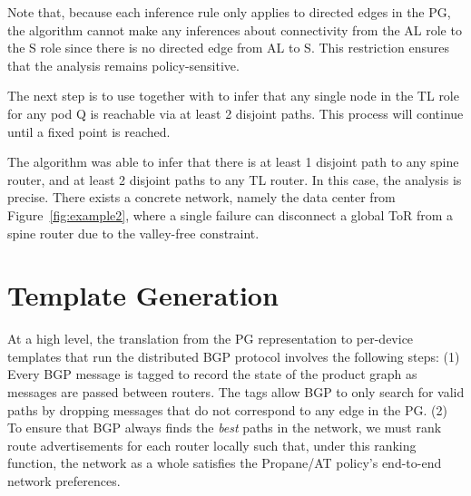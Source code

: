 \documentclass[numbers, 10pt]{sigplanconf}
\newcommand{\sysname}{{\text{}\small \sf Propane/AT}\xspace}
\newcommand{\KW}[1]{\texttt{\small\bfseries{#1}}}
\begin{document}
Note that, because each inference rule only applies to directed edges in the PG, the algorithm cannot make any inferences about connectivity from the AL role to the S role since there is no directed edge from AL to S. This restriction ensures that the analysis remains policy-sensitive.

The next step is to use  together with  to infer that any single node in the TL role for any pod Q is reachable via at least 2 disjoint paths. This process will continue until a fixed point is reached.

The algorithm was able to infer that there is at least 1 disjoint path to any spine router, and at least 2 disjoint paths to any TL router. In this case, the analysis is precise. There exists a concrete network, namely the data center from Figure~\ref{fig:example2}, where a single failure can disconnect a global ToR from a spine router due to the valley-free constraint.


%
%
%
%

\newcommand{\highlight}[1]{%
  \colorbox{red!50}{$\displaystyle#1$}}
\newcommand{\Router}[1]{\KW{Router} #1:}
\newcommand{\Template}[1]{\KW{Template} #1:}
\newcommand{\REGEX}[1]{\texttt{regex}(#1)}
\newcommand{\PEER}{\texttt{peer}}
\newcommand{\PREFIX}{\texttt{prefix}}
\newcommand{\IF}{\texttt{if}}
\newcommand{\THEN}{\texttt{then}}
\newcommand{\COMM}{\texttt{comm}}
\newcommand{\MED}{\texttt{MED}}
\newcommand{\Arrow}{\ensuremath{\leftarrow}}



\section{Template Generation}
\label{sec:generation}

At a high level, the translation from the PG representation to per-device templates that run the distributed BGP protocol involves the following steps: (1) Every BGP message is tagged to record the state of the product graph as messages are passed between routers. The tags allow BGP to only search for valid paths by dropping messages that do not correspond to any edge in the PG. (2) To ensure that BGP always finds the \emph{best} paths in the network, we must rank route advertisements for each router locally such that, under this ranking function, the network as a whole satisfies the \sysname policy's end-to-end network preferences. 
\end{document}

